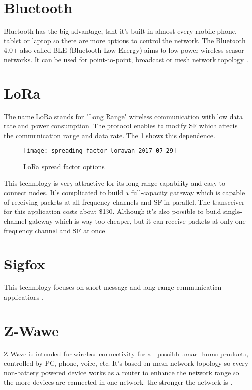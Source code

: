 \section{Bluetooth}
Bluetooth has the big advantage, taht it's built in almost every mobile phone, tablet or laptop so there are more options to control the network. The Bluetooth 4.0+ also called BLE (Bluetooth Low Energy) aims to low power wireless sensor networks.
It can be used for point-to-point, broadcast or mesh network topology \cite{13} \cite{14} \cite{15} \cite{16}.


\section{LoRa}
The name LoRa stands for "Long Range" wireless communication with low data rate and power consumption. The protocol enables to modify SF which affects the communication range and data rate. The \ref{fig:loraSF} shows this dependence.

\begin{figure}[!h]
    \centering
    \texttt{[image: spreading\_factor\_lorawan\_2017-07-29]}
    \caption{LoRa spread factor options \cite{24}}
    \label{fig:loraSF}
\end{figure}

This technology is very attractive for its long range capability and easy to connect nodes. It's complicated to build a full-capacity gateway which is capable of receiving packets at all frequency channels and SF in parallel. The transceiver for this application costs about \$130. Although it's also possible to build single-channel gateway which is way too cheaper, but it can receive packets at only one frequency channel and SF at once \cite{17} \cite{18} \cite{19} \cite{20} \cite{21} \cite{22} \cite{23} \cite{24}.


\section{Sigfox}
This technology focuses on short message and long range communication applications \cite{25} \cite{26}.


\section{Z-Wawe}
Z-Wave is intended for wireless connectivity for all possible smart home products, controlled by PC, phone, voice, etc. It's based on mesh network topology so every non-battery powered device works as a router to enhance the network range so the more devices are connected in one network, the stronger the network is \cite{27} \cite{28}.


